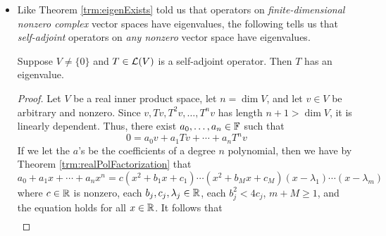 \documentclass[../main.tex]{subfiles}
\begin{document}
\begin{itemize}
\begin{theorem}
\begin{proof}
            Let $v\in V$ be arbitrary. Then we have that
            \begin{align*}
                \inp{(T^2+bT+cI)v}{v} &= \inp{T^2v}{v}+b\inp{Tv}{v}+c\inp{v}{v}\\
                &= \inp{Tv}{Tv}+b\inp{Tv}{v}+c\norm{v}^2\\
                &\geq \norm{Tv}^2-|b|\norm{Tv}\norm{v}+c\norm{v}^2\tag*{\hyperref[trm:CauchySchwarz]{Cauchy-Schwarz Inequality}}\\
                &= \left( \norm{Tv}-\frac{|b|\norm{v}}{2} \right)^2+\left( c-\frac{b^2}{4} \right)\norm{v}^2\\
                &> 0
            \end{align*}
            The overall strict inequality implies by the contrapositive of Theorem \ref{trm:inpPropertiesb} that $(T^2+bT+cI)v\neq 0$, as desired.
        \end{proof}
    \end{theorem}
    \item Like Theorem \ref{trm:eigenExists} told us that operators on \emph{finite-dimensional nonzero complex} vector spaces have eigenvalues, the following tells us that \emph{self-adjoint} operators on \emph{any nonzero} vector space have eigenvalues.
    \begin{theorem}\label{trm:eigenSelfAdjoint}
        Suppose $V\neq\{0\}$ and $T\in\mathcal{L}(V)$ is a self-adjoint operator. Then $T$ has an eigenvalue.
        \begin{proof}
            Let $V$ be a real inner product space, let $n=\dim V$, and let $v\in V$ be arbitrary and nonzero. Since $v,Tv,T^2v,\dots,T^nv$ has length $n+1>\dim V$, it is linearly dependent. Thus, there exist $a_0,\dots,a_n\in\mathbb{F}$ such that
            \begin{equation*}
                0 = a_0v+a_1Tv+\cdots+a_nT^nv
            \end{equation*}
            If we let the $a$'s be the coefficients of a degree $n$ polynomial, then we have by Theorem \ref{trm:realPolFactorization} that
            \begin{equation*}
                a_0+a_1x+\cdots+a_nx^n = c(x^2+b_1x+c_1)\cdots(x^2+b_Mx+c_M)(x-\lambda_1)\cdots(x-\lambda_m)
            \end{equation*}
            where $c\in\mathbb{R}$ is nonzero, each $b_j,c_j,\lambda_j\in\mathbb{R}$, each $b_j^2<4c_j$, $m+M\geq 1$, and the equation holds for all $x\in\mathbb{R}$. It follows that
            \begin{align*}

\end{align*}
\end{proof}
\end{theorem}
\end{itemize}
\end{document}
